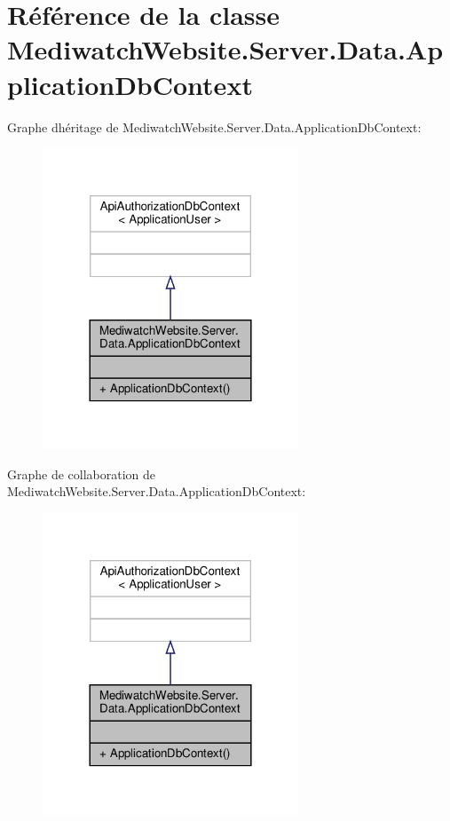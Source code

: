 \hypertarget{class_mediwatch_website_1_1_server_1_1_data_1_1_application_db_context}{}\section{Référence de la classe Mediwatch\+Website.\+Server.\+Data.\+Application\+Db\+Context}
\label{class_mediwatch_website_1_1_server_1_1_data_1_1_application_db_context}


Graphe d\textquotesingle{}héritage de Mediwatch\+Website.\+Server.\+Data.\+Application\+Db\+Context\+:
\nopagebreak
\begin{figure}[H]
\begin{center}
\leavevmode
\includegraphics[width=216pt]{class_mediwatch_website_1_1_server_1_1_data_1_1_application_db_context__inherit__graph}
\end{center}
\end{figure}


Graphe de collaboration de Mediwatch\+Website.\+Server.\+Data.\+Application\+Db\+Context\+:
\nopagebreak
\begin{figure}[H]
\begin{center}
\leavevmode
\includegraphics[width=216pt]{class_mediwatch_website_1_1_server_1_1_data_1_1_application_db_context__coll__graph}
\end{center}
\end{figure}

